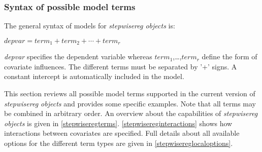 \subsubsection{Syntax of possible model terms}
\label{stepwiseregmodelsyntax}

The general syntax of models for {\em stepwisereg objects} is:

$depvar = term_1 + term_2 + \cdots + term_r$

{\em depvar} specifies the dependent variable whereas
$term_1$,\dots,$term_r$ define the form of covariate influences. The
different terms must be separated by '+' signs. A constant intercept
is automatically included in the model.

This section reviews all possible model terms supported in the
current version of {\em stepwisereg objects} and provides some specific
examples. Note that all terms may be combined in arbitrary
order. An overview about the capabilities of {\em stepwisereg objects}
is given in \autoref{stepwiseregterms}. \autoref{stepwisereginteractions}
shows how interactions between covariates are specified. Full
details about all available options for the different term types are given in
\autoref{stepwisereglocaloptions}.

